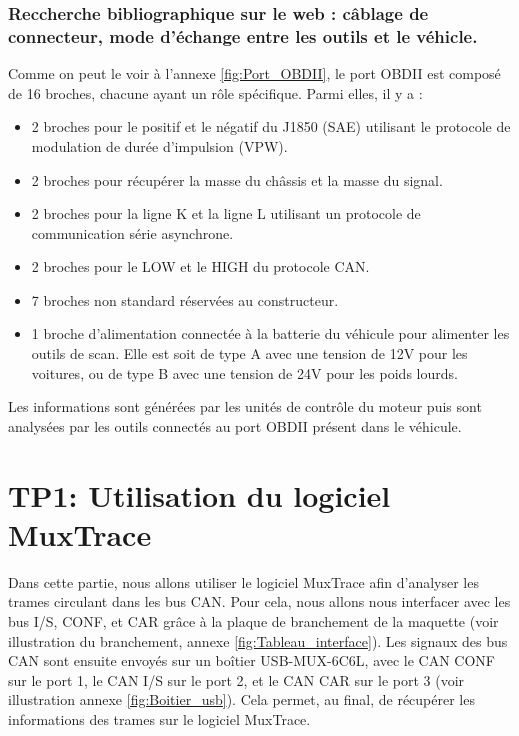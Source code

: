 \documentclass{rapportECC}
\begin{document}
\subsubsection*{Reccherche bibliographique sur le web : câblage de connecteur, mode d'échange entre les outils et le véhicle.}

Comme on peut le voir à l'annexe \ref{fig:Port_OBDII}, le port OBDII est composé de 16 broches, chacune ayant un rôle spécifique. Parmi elles, il y a :

\begin{itemize}
    \item 2 broches pour le positif et le négatif du J1850 (SAE) utilisant le protocole de modulation de durée d'impulsion (VPW).
    \item 2 broches pour récupérer la masse du châssis et la masse du signal.
    \item 2 broches pour la ligne K et la ligne L utilisant un protocole de communication série asynchrone.
    \item 2 broches pour le LOW et le HIGH du protocole CAN.
    \item 7 broches non standard réservées au constructeur.
    \item 1 broche d'alimentation connectée à la batterie du véhicule pour alimenter les outils de scan. Elle est soit de type A avec une tension de 12V pour les voitures, ou de type B avec une tension de 24V pour les poids lourds.
\end{itemize}

Les informations sont générées par les unités de contrôle du moteur puis sont analysées par les outils connectés au port OBDII présent dans le véhicule.


\section{TP1: Utilisation du logiciel MuxTrace}

Dans cette partie, nous allons utiliser le logiciel MuxTrace afin d'analyser les trames circulant dans les bus CAN. Pour cela, nous allons nous interfacer avec les bus I/S, CONF, et CAR grâce à la plaque de branchement de la maquette (voir illustration du branchement, annexe \ref{fig:Tableau_interface}). Les signaux des bus CAN sont ensuite envoyés sur un boîtier USB-MUX-6C6L, avec le CAN CONF sur le port 1, le CAN I/S sur le port 2, et le CAN CAR sur le port 3 (voir illustration annexe \ref{fig:Boitier_usb}). Cela permet, au final, de récupérer les informations des trames sur le logiciel MuxTrace. \pagebreak
\end{document}
